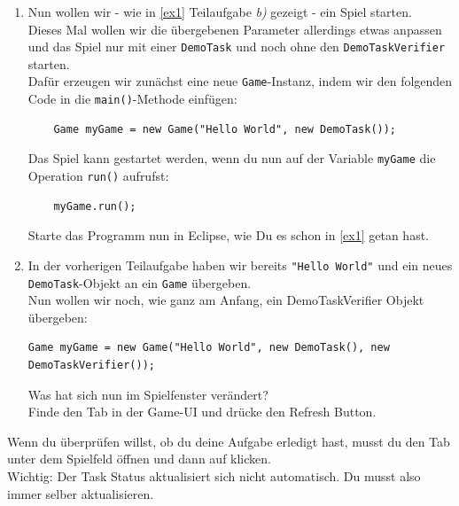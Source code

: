 
\label{ex3}

\begin{enumerate}
    \item Nun wollen wir - wie in \ref{ex1} Teilaufgabe \textit{b)} gezeigt - ein Spiel starten.\\
    Dieses Mal wollen wir die übergebenen Parameter allerdings etwas anpassen und das Spiel nur mit einer \lstinline{DemoTask} und noch ohne den \lstinline{DemoTaskVerifier} starten.\\
	Dafür erzeugen wir zunächst eine neue \lstinline{Game}-Instanz, indem wir den folgenden Code in die \lstinline{main()}-Methode einfügen:

    \begin{lstlisting}
	Game myGame = new Game("Hello World", new DemoTask());
    \end{lstlisting}

    Das Spiel kann gestartet werden, wenn du nun auf der Variable \lstinline{myGame} die Operation \lstinline{run()} aufrufst:

    \begin{lstlisting}
	myGame.run();
    \end{lstlisting}

    Starte das Programm nun in Eclipse, wie Du es schon in \ref{ex1} getan hast.

    \vspace{5mm}

    \item In der vorherigen Teilaufgabe haben wir bereits \lstinline{"Hello World"} und ein neues \lstinline{DemoTask}-Objekt an ein \lstinline{Game} übergeben.\\
    Nun wollen wir noch, wie ganz am Anfang, ein DemoTaskVerifier Objekt übergeben:

    \begin{lstlisting}
Game myGame = new Game("Hello World", new DemoTask(), new DemoTaskVerifier());
    \end{lstlisting}

        Was hat sich nun im Spielfenster verändert?\\
        Finde den  Tab in der Game-UI und drücke den Refresh Button.

\end{enumerate}


\begin{Infobox}
    Wenn du überprüfen willst, ob du deine Aufgabe erledigt hast, musst du den  Tab unter dem Spielfeld öffnen und dann auf  klicken.\\

    Wichtig: Der Task Status aktualisiert sich nicht automatisch. Du musst also immer selber aktualisieren.
\end{Infobox}


